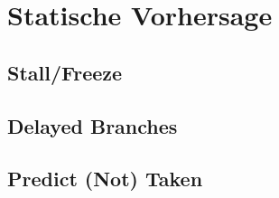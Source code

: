 
\section{Statische Vorhersage}
\subsection{Stall/Freeze}
\subsection{Delayed Branches}
\subsection{Predict (Not) Taken}




